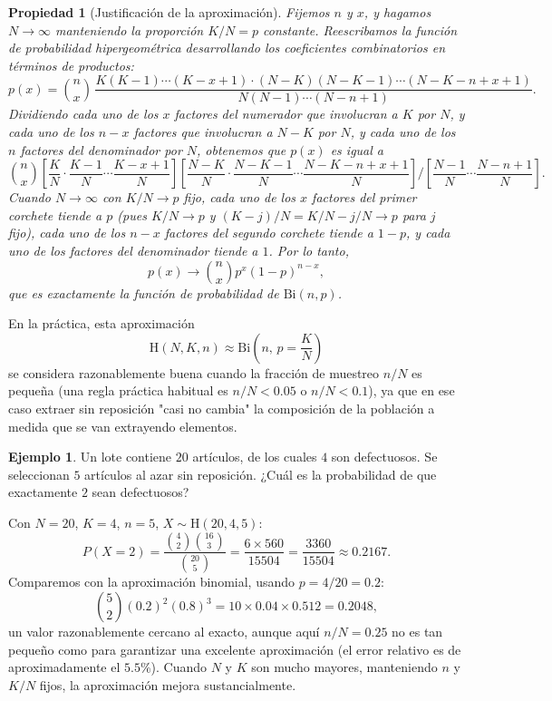\documentclass[11pt,a4paper]{article}
\theoremstyle{plain}
\newtheorem{propiedad}[teorema]{Propiedad}
\theoremstyle{definition}
\newtheorem{ejemplo}[teorema]{Ejemplo}
\theoremstyle{remark}
\begin{document}
\begin{propiedad}[Justificación de la aproximación]
Fijemos $n$ y $x$, y hagamos $N\to\infty$ manteniendo la proporción $K/N=p$ constante. Reescribamos la función de probabilidad hipergeométrica desarrollando los coeficientes combinatorios en términos de productos:
$$p(x)=\binom{n}{x}\,\frac{K(K-1)\cdots(K-x+1)\cdot(N-K)(N-K-1)\cdots(N-K-n+x+1)}{N(N-1)\cdots(N-n+1)}.$$
Dividiendo cada uno de los $x$ factores del numerador que involucran a $K$ por $N$, y cada uno de los $n-x$ factores que involucran a $N-K$ por $N$, y cada uno de los $n$ factores del denominador por $N$, obtenemos que $p(x)$ es igual a
$$\binom{n}{x}\left[\frac{K}{N}\cdot\frac{K-1}{N}\cdots\frac{K-x+1}{N}\right]\left[\frac{N-K}{N}\cdot\frac{N-K-1}{N}\cdots\frac{N-K-n+x+1}{N}\right]\Big/\left[\frac{N-1}{N}\cdots\frac{N-n+1}{N}\right].$$
Cuando $N\to\infty$ con $K/N\to p$ fijo, cada uno de los $x$ factores del primer corchete tiende a $p$ (pues $K/N\to p$ y $(K-j)/N=K/N-j/N\to p$ para $j$ fijo), cada uno de los $n-x$ factores del segundo corchete tiende a $1-p$, y cada uno de los factores del denominador tiende a $1$. Por lo tanto,
$$p(x)\longrightarrow\binom{n}{x}p^x(1-p)^{n-x},$$
que es exactamente la función de probabilidad de $\text{Bi}(n,p)$.
\end{propiedad}

En la práctica, esta aproximación
$$\text{H}(N,K,n)\approx\text{Bi}\left(n,\,p=\frac{K}{N}\right)$$
se considera razonablemente buena cuando la fracción de muestreo $n/N$ es pequeña (una regla práctica habitual es $n/N<0.05$ o $n/N<0.1$), ya que en ese caso extraer sin reposición "casi no cambia" la composición de la población a medida que se van extrayendo elementos.

\begin{ejemplo}
Un lote contiene $20$ artículos, de los cuales $4$ son defectuosos. Se seleccionan $5$ artículos al azar sin reposición. ¿Cuál es la probabilidad de que exactamente $2$ sean defectuosos?

Con $N=20$, $K=4$, $n=5$, $X\sim\text{H}(20,4,5)$:
$$P(X=2)=\frac{\binom{4}{2}\binom{16}{3}}{\binom{20}{5}}=\frac{6\times560}{15504}=\frac{3360}{15504}\approx0.2167.$$
Comparemos con la aproximación binomial, usando $p=4/20=0.2$:
$$\binom{5}{2}(0.2)^2(0.8)^3=10\times0.04\times0.512=0.2048,$$
un valor razonablemente cercano al exacto, aunque aquí $n/N=0.25$ no es tan pequeño como para garantizar una excelente aproximación (el error relativo es de aproximadamente el $5.5\%$). Cuando $N$ y $K$ son mucho mayores, manteniendo $n$ y $K/N$ fijos, la aproximación mejora sustancialmente.
\end{ejemplo}
\end{document}
